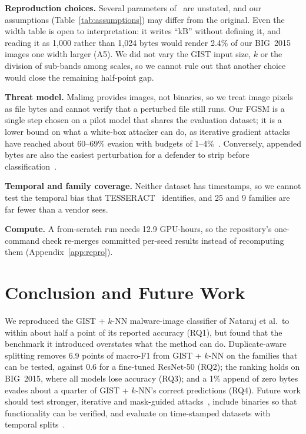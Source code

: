 \documentclass[conference]{IEEEtran}
\begin{document}
\textbf{Reproduction choices.} Several parameters of~\cite{nataraj2011images} are
unstated, and our assumptions (Table~\ref{tab:assumptions}) may differ from the
original. Even the width table is open to interpretation: it writes ``kB'' without
defining it, and reading it as 1,000 rather than 1,024 bytes would render
2.4\% of our BIG~2015 images one width larger (A5). We did not vary the GIST input size, $k$ or the division of sub-bands
among scales, so we cannot rule out that another choice would close the remaining
half-point gap.

\textbf{Threat model.} Malimg provides images, not binaries, so we treat image pixels
as file bytes and cannot verify that a perturbed file still runs. Our FGSM is a single
step chosen on a pilot model that shares the evaluation dataset; it is a lower bound
on what a white-box attacker can do, as iterative gradient attacks have reached about
60--69\% evasion with budgets of 1--4\%~\cite{kolosnjaji2018adversarial,zhan2023amgmal}.
Conversely, appended bytes are also the easiest perturbation for a defender to strip
before classification~\cite{demetrio2021exemples}.

\textbf{Temporal and family coverage.} Neither dataset has timestamps, so we cannot
test the temporal bias that TESSERACT~\cite{pendlebury2019tesseract} identifies, and
25 and 9 families are far fewer than a vendor sees.

\textbf{Compute.} A from-scratch run needs 12.9 GPU-hours, so the repository's
one-command check re-merges committed per-seed results instead of recomputing them
(Appendix~\ref{app:repro}).

\section{Conclusion and Future Work}
We reproduced the GIST + $k$-NN malware-image classifier of Nataraj et al.\ to within
about half a point of its reported accuracy (RQ1), but found that the benchmark it
introduced overstates what the method can do. Duplicate-aware splitting removes
6.9 points of macro-F1 from GIST + $k$-NN on the families that can be tested,
against 0.6 for a fine-tuned ResNet-50 (RQ2); the ranking holds on BIG~2015,
where all models lose accuracy (RQ3); and a 1\% append of zero bytes evades about a
quarter of GIST + $k$-NN's correct predictions (RQ4). Future work should test stronger,
iterative and mask-guided attacks~\cite{zhan2023amgmal,tariq2026framework}, include
binaries so that functionality can be verified, and evaluate on time-stamped datasets
with temporal splits~\cite{pendlebury2019tesseract}.
\end{document}
